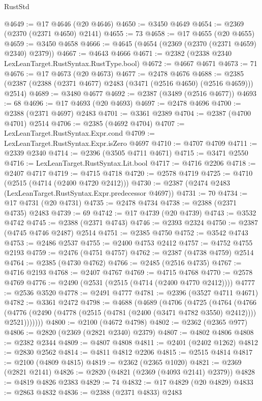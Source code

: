 \begin{lexlean}{RustStd}
\begin{coremodule}
@4649 := @17 @4646 (@20 @4646)
@4650 := @3450 @4649
@4654 := @2369 (@2370 (@2371 @4650) @2141)
@4655 := 73
@4658 := @17 @4655 (@20 @4655)
@4659 := @3450 @4658
@4666 := @4645 (@4654 (@2369 (@2370 (@2371 @4659) @2340) @2379))
@4667 := @4643 @4666
@4671 := @2382 (@2338 @2340 LexLeanTarget.RustSyntax.RustType.bool)
@4672 := @4667 @4671
@4673 := 71
@4676 := @17 @4673 (@20 @4673)
@4677 := @2478 @4676
@4688 := @2385 (@2387 (@2388 (@2371 @4677) @2483 (@3471 (@2516 @4650) (@2516 @4659))) @2514)
@4689 := @3480 @4677
@4692 := @2387 (@3489 (@2516 @4677))
@4693 := 68
@4696 := @17 @4693 (@20 @4693)
@4697 := @2478 @4696
@4700 := @2388 (@2371 @4697) @2483
@4701 := @3361 @2389
@4704 := @2387 (@4700 @4701) @2514
@4706 := @2385 (@4692 @4704)
@4707 := LexLeanTarget.RustSyntax.Expr.cond
@4709 := LexLeanTarget.RustSyntax.Expr.isZero @4697
@4710 := @4707 @4709
@4711 := @2339 @2340
@4714 := @2396 (@3505 @4711 @4671)
@4715 := @3471 @2550
@4716 := LexLeanTarget.RustSyntax.Lit.bool
@4717 := @4716 @2206
@4718 := @2407 @4717
@4719 := @4715 @4718
@4720 := @2578 @4719
@4725 := @4710 (@2515 (@4714 (@2400 @4720 @2412)))
@4730 := @2387 (@2474 @2483 (LexLeanTarget.RustSyntax.Expr.predecessor @4697))
@4731 := 70
@4734 := @17 @4731 (@20 @4731)
@4735 := @2478 @4734
@4738 := @2388 (@2371 @4735) @2483
@4739 := 69
@4742 := @17 @4739 (@20 @4739)
@4743 := @3532 @4742
@4745 := @2388 (@2371 @4743)
@4746 := @2393 @2324
@4750 := @2387 (@4745 @4746 @2487) @2514
@4751 := @2385 @4750
@4752 := @3542 @4743
@4753 := @2486 @2537
@4755 := @2400 @4753 @2412
@4757 := @4752 @4755 @2193
@4759 := @2476 (@4751 @4757)
@4762 := @2387 (@4738 @4759) @2514
@4764 := @2385 (@4730 @4762)
@4766 := @2485 (@2516 @4735)
@4767 := @4716 @2193
@4768 := @2407 @4767
@4769 := @4715 @4768
@4770 := @2578 @4769
@4776 := @2490 (@2531 (@2515 (@4714 (@2400 @4770 @2412))))
@4777 := @2536 @3520
@4778 := @2491 @4777
@4781 := @2396 (@3527 @4711 @4671)
@4782 := @3361 @2472
@4798 := @4688
    (@4689
      (@4706
        (@4725
          (@4764
            (@4766
              (@4776 (@2490 (@4778 (@2515 (@4781 (@2400 (@3471 @4782 @3550) @2412)))) @2521)))))))
@4800 := @2100 (@4672 @4798)
@4802 := @2362 (@2365 @977)
@4806 := @2820 (@2369 (@2821 @2340) @2379)
@4807 := @4802 @4806
@4808 := @2382 @2344
@4809 := @4807 @4808
@4811 := @2401 (@2402 @1262)
@4812 := @2830 @2562
@4814 := @4811 @4812 @2206
@4815 := @2515 @4814
@4817 := @2100 (@4809 @4815)
@4819 := @2362 (@2365 @1020)
@4821 := @2369 (@2821 @2141)
@4826 := @2820 (@4821 (@2369 (@4093 @2141) @2379))
@4828 := @4819 @4826 @2383
@4829 := 74
@4832 := @17 @4829 (@20 @4829)
@4833 := @2863 @4832
@4836 := @2388 (@2371 @4833) @2483

\end{coremodule}
\end{lexlean}
